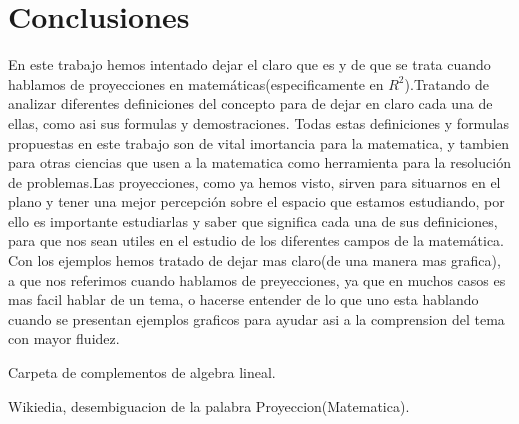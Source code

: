 \documentclass[11pt,spanish,a4paper]{article}
\begin{document}
\section{Conclusiones}
En este trabajo hemos intentado dejar el claro que es y de que se trata cuando hablamos de proyecciones en matemáticas(especificamente en $R^2$).Tratando de analizar diferentes definiciones del concepto para de dejar en claro cada una de ellas, como asi sus formulas y demostraciones. \linebreak
Todas estas definiciones y formulas propuestas en este trabajo son de vital imortancia para la matematica, y tambien para otras ciencias que usen a la matematica como herramienta para la resolución de problemas.Las proyecciones, como ya hemos visto, sirven para situarnos en el plano y tener una mejor percepción sobre el espacio que estamos estudiando, por ello es importante estudiarlas y saber que significa cada una de sus definiciones, para que nos sean utiles en el estudio de los diferentes campos de la matemática.
Con los ejemplos hemos tratado de dejar mas claro(de una manera mas grafica), a que nos referimos cuando hablamos de preyecciones, ya que en muchos casos es mas facil hablar de un tema, o hacerse entender de lo que uno esta hablando cuando se presentan ejemplos graficos para ayudar asi a la comprension del tema con mayor fluidez.


\begin{thebibliography}{10}

Carpeta de complementos de algebra lineal.

 Wikiedia, desembiguacion de la palabra Proyeccion(Matematica). 

\end{thebibliography}
\end{document}
